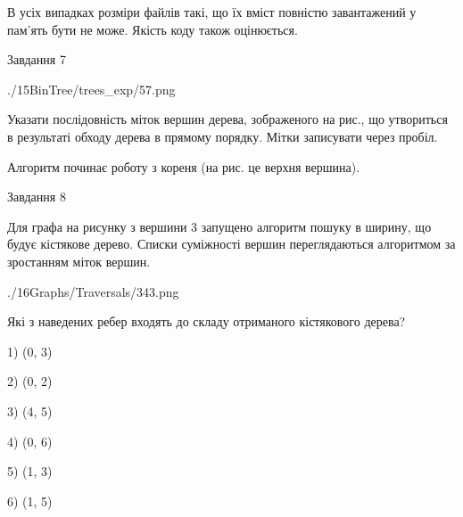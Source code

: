\documentclass[12pt, ukrainian]{article}
\begin{document}
{В усіх випадках розміри файлів такі, що їх вміст повністю завантажений у пам'ять бути не може. Якість коду також оцінюється.



\vspace{10mm}\par

\newpage
\begin{minipage}[t]{9.7cm}
               
{\begin{center}Завдання {7}\end{center}}
\vspace{-6mm}

\begin{center}
	{./15BinTree/trees_exp/57.png}
\end{center}
Указати послідовність міток вершин дерева, зображеного на рис., що утвориться в результаті обходу дерева в прямому порядку. Мітки записувати через пробіл.\par Алгоритм починає роботу з кореня (на рис. це верхня вершина).\par

\end{minipage}
\vline \hspace{8mm}
\begin{minipage}[t]{8.0cm}
               
{\begin{center}Завдання {8}\end{center}}
\vspace{-6mm}
Для графа на рисунку з вершини 3 запущено алгоритм пошуку в ширину, що будує кістякове дерево. Списки суміжності вершин переглядаються алгоритмом за зростанням міток вершин.\par
\begin{center}
	{./16Graphs/Traversals/343.png}
\end{center}
\par Які з наведених ребер входять до складу отриманого кістякового дерева?\par
1) (0, 3)\par
2) (0, 2)\par
3) (4, 5)\par
4) (0, 6)\par
5) (1, 3)\par
6) (1, 5)\par
{\vskip 15pt} \par


\end{minipage}}
\end{document}

